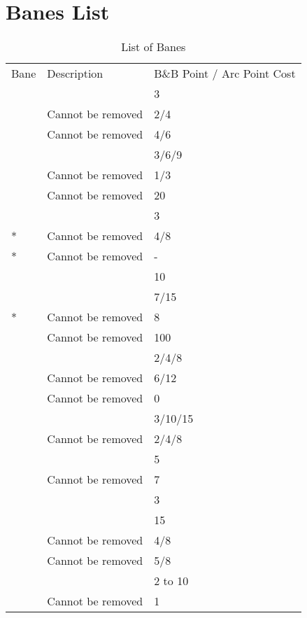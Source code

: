 \documentclass[oneside,11pt,english]{book}
\begin{document}
\section{Banes List}
\begin{table}[!h]
	\caption{List of Banes}
	\label{tab:Banes List}
	\begin{tabu} to \linewidth {X X X}
		Bane&Description&B\&B Point / Arc Point Cost\\
	&&3\\
 		&Cannot be removed &2/4\\
 		&Cannot be removed &4/6\\
 &&3/6/9\\
 &Cannot be removed &1/3\\
 &Cannot be removed&20\\
 &&3\\
* &Cannot be removed &4/8\\
* &Cannot be removed& -\\
 &&10\\
 &&7/15\\
* &Cannot be removed &8\\
 &Cannot be removed &100\\
 &&2/4/8\\
 &Cannot be removed &6/12\\
 &Cannot be removed &0\\
 &&3/10/15\\
 &Cannot be removed &2/4/8\\
 &&5\\
 &Cannot be removed &7\\
 &&3\\
 &&15\\
 &Cannot be removed &4/8\\
 &Cannot be removed &5/8\\
 &&2 to 10\\
 &Cannot be removed &1\\

\end{tabu}
\end{table}
\end{document}

